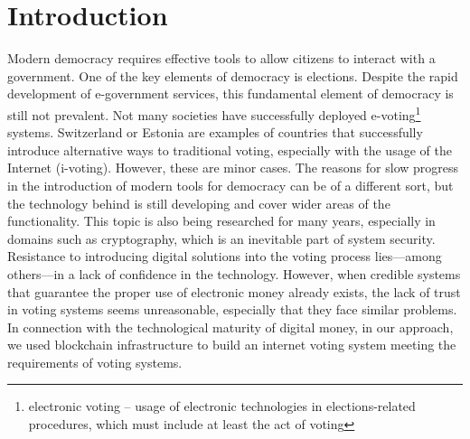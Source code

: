 \documentclass[applsci,article,submit,moreauthors,pdftex]{Definitions/mdpi}
\begin{document}
 


\section{Introduction}


Modern democracy requires effective tools to allow citizens to interact with a government. One of the key elements of democracy is elections. Despite the rapid development of e-government services,
this fundamental element of democracy is still not prevalent. Not many societies have successfully deployed e-voting\footnote{electronic voting -- usage of electronic technologies in elections-related procedures, which must include at least the act of voting} systems. 
Switzerland or Estonia are examples of countries that successfully introduce alternative ways to traditional voting, especially with the usage of the Internet (i-voting). However, these are minor cases.
The reasons for slow progress in the introduction of modern tools for democracy can be of a different sort, but the technology behind is still developing and cover wider areas of the functionality.
This topic is also being researched for many years, 
especially in domains such as cryptography, which is an inevitable part of system security. 
Resistance to introducing digital solutions into the voting process lies––among others––in a lack of confidence in the technology. However, when credible systems that guarantee the proper use of electronic money already exists, the lack of trust in voting systems seems unreasonable, especially that they face similar problems. In connection with the technological maturity of digital money, in our approach, we used blockchain infrastructure to build an internet voting system meeting the requirements of voting systems.
 
\end{document}
